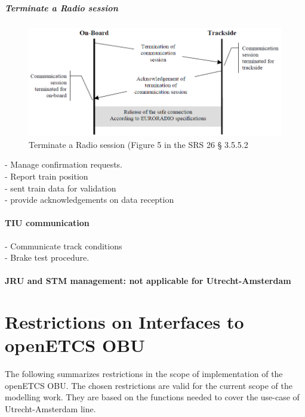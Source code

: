 \documentclass{template/openetcs_report}
\begin{document}
\paragraph{Terminate a Radio session}
\begin{figure}[hbtp]
\centering
\includegraphics [scale=0.5]{images/TerminationRadiosession}
\caption{Terminate a Radio session (Figure 5 in the SRS 26 § 3.5.5.2}
\end{figure}
\newpage


- Manage confirmation requests.\\
- Report train position\\
- sent train data for validation\\
- provide acknowledgements on data reception\\

\subsubsection{TIU communication}
- Communicate track conditions\\
- Brake test procedure.\\

\subsubsection{JRU and \gls{STM} management: not applicable for Utrecht-Amsterdam}

\newpage

 
\appendix{}

\chapter{Restrictions on Interfaces to openETCS OBU}
The following summarizes restrictions in the scope of implementation of the openETCS OBU. The chosen restrictions are valid for the current scope of the modelling work. They are based on the functions needed to cover the use-case of Utrecht-Amsterdam line.
\end{document}
